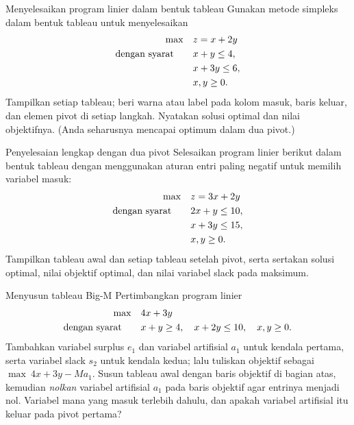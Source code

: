 \begin{ex}{Menyelesaikan program linier dalam bentuk tableau}{}
\label{ex:tableau-solve-lp}
 Gunakan metode simpleks dalam bentuk tableau untuk menyelesaikan
\[
\begin{aligned}
\max\quad & z = x + 2y\\
\mbox{dengan syarat}\quad\quad  & x + y  \le 4,\\
          & x + 3y \le 6,\\
          & x, y \ge 0.
\end{aligned}
\]
Tampilkan setiap tableau; beri warna atau label pada kolom masuk, baris keluar,
dan elemen pivot di setiap langkah. Nyatakan solusi optimal dan nilai
objektifnya. (Anda seharusnya mencapai optimum dalam dua pivot.)
\exrefs{\S\ref{sec:tableau-pivot}; \S\ref{sec:tableau-optimality}}
\end{ex}

\begin{ex}{Penyelesaian lengkap dengan dua pivot}{}
\label{ex:tableau-two-pivot-solve}
 Selesaikan program linier berikut dalam bentuk tableau dengan
menggunakan aturan entri paling negatif untuk memilih variabel masuk:
\[
\begin{aligned}
\max\quad & z = 3x + 2y\\
\mbox{dengan syarat}\quad\quad  & 2x + y  \le 10,\\
          & x + 3y \le 15,\\
          & x, y \ge 0.
\end{aligned}
\]
Tampilkan tableau awal dan setiap tableau setelah pivot, serta sertakan solusi
optimal, nilai objektif optimal, dan nilai variabel slack pada maksimum.
\exrefs{\S\ref{sec:tableau-pivot}; \S\ref{sec:tableau-optimality}}
\end{ex}

\begin{ex}{Menyusun tableau Big-M}{}
\label{ex:tableau-bigm-setup}
 Pertimbangkan program linier
\[
\begin{aligned}
\max\quad & 4x + 3y \\
\mbox{dengan syarat}\quad\quad  & x + y \ge 4,\quad x + 2y \le 10,\quad x,y \ge 0.
\end{aligned}
\]
Tambahkan variabel surplus $e_1$ dan variabel artifisial $a_1$ untuk kendala
pertama, serta variabel slack $s_2$ untuk kendala kedua; lalu tuliskan objektif
sebagai $\max\ 4x + 3y - M a_1$. Susun tableau awal dengan baris objektif di
bagian atas, kemudian \emph{nolkan} variabel artifisial $a_1$ pada baris
objektif agar entrinya menjadi nol. Variabel mana yang masuk terlebih dahulu,
dan apakah variabel artifisial itu keluar pada pivot pertama?
\exrefs{\S\ref{sec:tableau-bigm}}
\end{ex}

